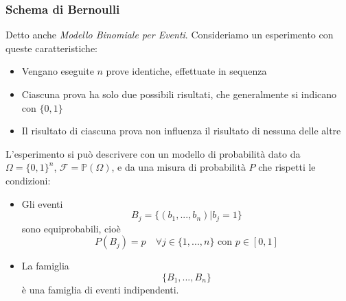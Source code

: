 \documentclass{article}
\theoremstyle{plain}
\theoremstyle{definition}
\theoremstyle{remark}
\begin{document}
\subsubsection{Schema di Bernoulli} %
\label{ssub:schema_di_bernoulli}
Detto anche \textit{Modello Binomiale per Eventi}. Consideriamo un esperimento con queste caratteristiche:
\begin{itemize}
	\item Vengano eseguite $n$ prove identiche, effettuate in sequenza
	\item Ciascuna prova ha solo due possibili risultati, che generalmente si indicano con $\{0,1\}$
	\item Il risultato di ciascuna prova non influenza il risultato di nessuna delle altre
\end{itemize}
L'esperimento si può descrivere con un modello di probabilità dato da $\Omega=\{0,1\}^n$, $\mathcal{F}=\mathds{P}(\Omega)$, e da una misura di probabilità $P$ che rispetti le condizioni:
\begin{itemize}
	\item Gli eventi
	\begin{equation*}
		B_j=\{(b_1,...,b_n)|b_j=1\}
	\end{equation*}
	sono equiprobabili, cioè
	\begin{equation*}
		P(B_j)=p\quad\forall j\in\{1,...,n\}\text{ con }p\in[0,1]
	\end{equation*}
	\item La famiglia
	\begin{equation*}
		\{B_1,...,B_n\}
	\end{equation*}
	è una famiglia di eventi indipendenti.
\end{itemize}
\end{document}
